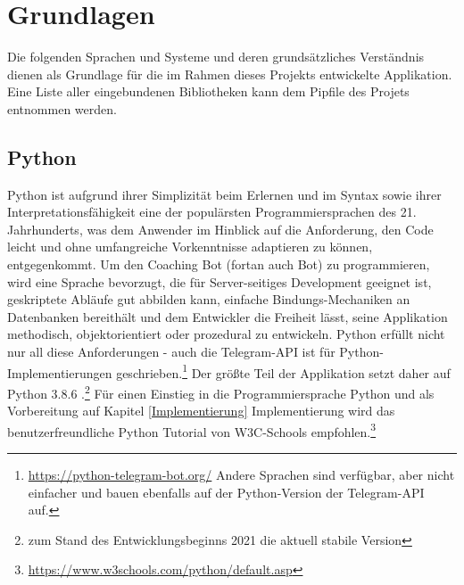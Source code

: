 \chapter{Grundlagen} \label{Grundlagen}
Die folgenden Sprachen und Systeme und deren grundsätzliches Verständnis dienen als Grundlage für die im Rahmen dieses Projekts entwickelte Applikation. Eine Liste aller eingebundenen Bibliotheken kann dem Pipfile des Projets entnommen werden. 


    \section{Python}
        Python ist aufgrund ihrer Simplizität beim Erlernen und im Syntax sowie ihrer Interpretationsfähigkeit eine der populärsten Programmiersprachen des 21. Jahrhunderts, was dem Anwender im Hinblick auf die Anforderung, den Code leicht und ohne umfangreiche Vorkenntnisse adaptieren zu können, entgegenkommt. Um den Coaching Bot (fortan auch \glqq Bot\grqq) zu programmieren, wird eine Sprache bevorzugt, die für Server-seitiges Development geeignet ist, geskriptete Abläufe gut abbilden kann, einfache Bindungs-Mechaniken an Datenbanken bereithält und dem Entwickler die Freiheit lässt, seine Applikation methodisch, objektorientiert oder prozedural zu entwickeln.\cite{python} Python erfüllt nicht nur all diese Anforderungen - auch die Telegram-API ist für Python-Implementierungen geschrieben.\footnote{\url{https://python-telegram-bot.org/} Andere Sprachen sind verfügbar, aber nicht einfacher und bauen ebenfalls auf der Python-Version der Telegram-API auf.}
        Der größte Teil der Applikation setzt daher auf Python 3.8.6 \cite{python3.8.6}.\footnote{zum Stand des Entwicklungsbeginns 2021 die aktuell stabile Version} 
        Für einen Einstieg in die Programmiersprache Python und als Vorbereitung auf Kapitel \ref{Implementierung} Implementierung wird das benutzerfreundliche Python Tutorial von W3C-Schools empfohlen.\footnote{\url{https://www.w3schools.com/python/default.asp}}


